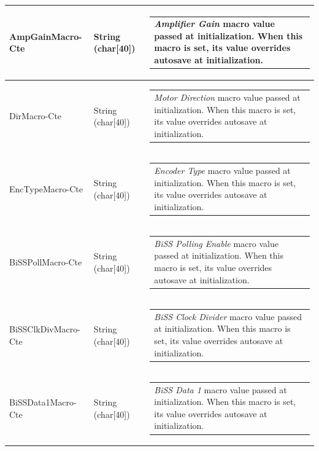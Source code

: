 \documentclass[openany]{article}
\begin{document}
\begin{longtable}{| m{4.5cm} m{2.5cm}  m{8.5cm} |}
        AmpGainMacro-Cte & String (char[40]) & \begin{tabular}{@{}m{6cm}@{}}
                \emph{Amplifier Gain} macro value passed at initialization. When this macro is set, its value overrides autosave at initialization.
            \end{tabular} \hypertarget{pv:dir-macro-cte}{}\\ \hline
        DirMacro-Cte & String (char[40]) & \begin{tabular}{@{}m{6cm}@{}}
                \emph{Motor Direction} macro value passed at initialization. When this macro is set, its value overrides autosave at initialization.
            \end{tabular} \hypertarget{pv:enc-type-macro-cte}{}\\ \hline
        EncTypeMacro-Cte & String (char[40]) & \begin{tabular}{@{}m{6cm}@{}}
                \emph{Encoder Type} macro value passed at initialization. When this macro is set, its value overrides autosave at initialization.
            \end{tabular} \hypertarget{pv:biss-poll-macro-cte}{}\\ \hline
        BiSSPollMacro-Cte & String (char[40]) & \begin{tabular}{@{}m{6cm}@{}}
                \emph{BiSS Polling Enable} macro value passed at initialization. When this macro is set, its value overrides autosave at initialization.
            \end{tabular} \hypertarget{pv:biss-clk-div-macro-cte}{}\\ \hline
        BiSSClkDivMacro-Cte & String (char[40]) & \begin{tabular}{@{}m{6cm}@{}}
                \emph{BiSS Clock Divider} macro value passed at initialization. When this macro is set, its value overrides autosave at initialization.
            \end{tabular} \hypertarget{pv:biss-data-1--macro-cte}{}\\ \hline
        BiSSData1Macro-Cte & String (char[40]) & \begin{tabular}{@{}m{6cm}@{}}
                \emph{BiSS Data 1} macro value passed at initialization. When this macro is set, its value overrides autosave at initialization.
            \end{tabular} \hypertarget{pv:biss-data-2-macro-cte}{}\\ \hline

\end{longtable}
\end{document}
